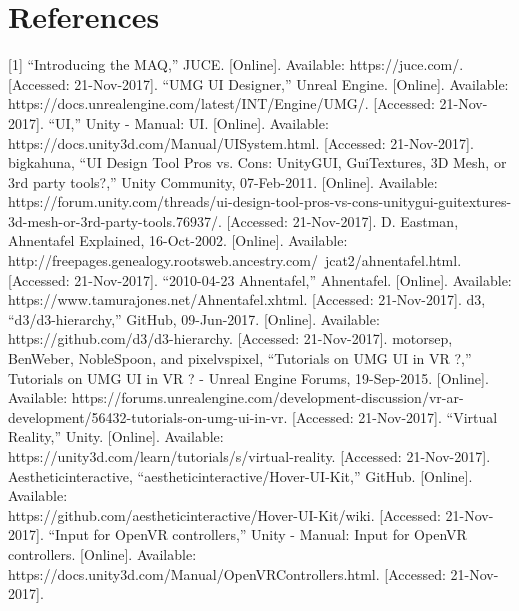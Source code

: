 \documentclass[onecolumn, draftclsnofoot,10pt, compsoc]{IEEEtran}
\begin{document}
\section{References}
[1] “Introducing the MAQ,” JUCE. [Online]. Available: https://juce.com/. [Accessed: 21-Nov-2017]. 
\newline
[2] “UMG UI Designer,” Unreal Engine. [Online]. Available: https://docs.unrealengine.com/latest/INT/Engine/UMG/. [Accessed: 21-Nov-2017]. 
\newline
[3] “UI,” Unity - Manual: UI. [Online]. Available: https://docs.unity3d.com/Manual/UISystem.html. [Accessed: 21-Nov-2017].
\newline
[4] bigkahuna, “UI Design Tool Pros vs. Cons: UnityGUI, GuiTextures, 3D Mesh, or 3rd party tools?,” Unity Community, 07-Feb-2011. [Online]. Available: https://forum.unity.com/threads/ui-design-tool-pros-vs-cons-unitygui-guitextures-3d-mesh-or-3rd-party-tools.76937/. [Accessed: 21-Nov-2017].
\newline
[5] D. Eastman, Ahnentafel Explained, 16-Oct-2002. [Online]. Available:\\ http://freepages.genealogy.rootsweb.ancestry.com/~jcat2/ahnentafel.html. [Accessed: 21-Nov-2017].
\newline
[6] “2010-04-23 Ahnentafel,” Ahnentafel. [Online]. Available: https://www.tamurajones.net/Ahnentafel.xhtml. [Accessed: 21-Nov-2017].
\newline
[7] d3, “d3/d3-hierarchy,” GitHub, 09-Jun-2017. [Online]. Available: https://github.com/d3/d3-hierarchy. [Accessed: 21-Nov-2017].
\newline
[8] motorsep, BenWeber, NobleSpoon, and pixelvspixel, “Tutorials on UMG UI in VR ?,” Tutorials on UMG UI in VR ? - Unreal Engine Forums, 19-Sep-2015. [Online]. Available: https://forums.unrealengine.com/development-discussion/vr-ar-development/56432-tutorials-on-umg-ui-in-vr. [Accessed: 21-Nov-2017].
\newline
[9] “Virtual Reality,” Unity. [Online]. Available: https://unity3d.com/learn/tutorials/s/virtual-reality. [Accessed: 21-Nov-2017].
\newline
[10] Aestheticinteractive, “aestheticinteractive/Hover-UI-Kit,” GitHub. [Online]. Available:\\ https://github.com/aestheticinteractive/Hover-UI-Kit/wiki. [Accessed: 21-Nov-2017].
\newline
[11] “Input for OpenVR controllers,” Unity - Manual: Input for OpenVR controllers. [Online]. Available: \\ https://docs.unity3d.com/Manual/OpenVRControllers.html. [Accessed: 21-Nov-2017]. 	
\end{document}
